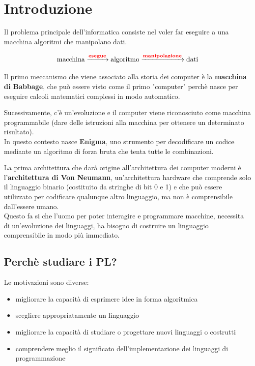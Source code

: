 
\chapter{Introduzione}
Il problema principale dell'informatica consiste nel voler far eseguire a una macchina algoritmi che manipolano dati.

\[
    \text{macchina} \xrightarrow{\textcolor{red}{\textbf{esegue}}} \text{algoritmo} \xrightarrow{\textcolor{red}{\textbf{manipolazione}}} \text{dati}
\]

Il primo meccanismo che viene associato alla storia dei computer è la \textbf{macchina di Babbage}, che può essere visto come il primo "computer" perchè nasce per eseguire calcoli matematici complessi in modo automatico.

\smallskip
Sucessivamente, c'è un'evoluzione e il computer viene riconosciuto come macchina programmabile (dare delle istruzioni alla macchina per ottenere un determinato risultato).\\[0.2ex]
In questo contesto nasce \textbf{Enigma}, uno strumento per decodificare un codice mediante un algoritmo di forza bruta che tenta tutte le combinazioni.

La prima architettura che darà origine all'architettura dei computer moderni è l'\textcolor{colore}{\textbf{architettura di Von Neumann}}, un'architettura hardware che comprende solo il linguaggio binario (costituito da stringhe di bit 0 e 1) e che può essere utilizzato per codificare qualunque altro linguaggio, ma non è comprensibile dall'essere umano.\\[0.2ex]
Questo fa si che l'uomo per poter interagire e programmare macchine, necessita di un'evoluzione dei linguaggi, ha bisogno di costruire un linguaggio comprensibile in modo più immediato.

\section{Perchè studiare i PL?}
Le motivazioni sono diverse:
\begin{itemize}[label=$\triangleright$, itemsep=\smallskipamount]
    \item migliorare la capacità di esprimere idee in forma algoritmica
    \item scegliere appropriatamente un linguaggio
    \item migliorare la capacità di studiare o progettare nuovi linguaggi o costrutti
    \item comprendere meglio il significato dell'implementazione dei linguaggi di programmazione
\end{itemize}

